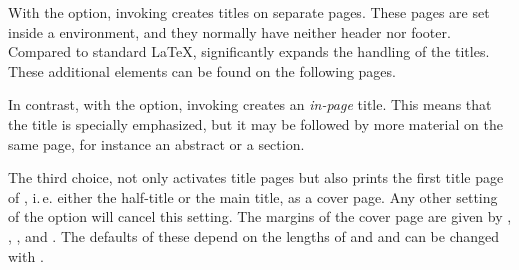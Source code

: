 With the %
 option,
invoking  creates titles on
separate pages. These pages are set inside a
 environment, and they
normally have neither header nor footer. Compared to standard {\LaTeX},
{\KOMAScript} significantly expands the handling of the titles. These
additional elements can be found on the following pages.

In contrast, with the
option, invoking  creates an
\emph{in-page} title. This means that the title is specially emphasized, but
it may be followed by more material on the same page, for instance an abstract
or a section.%

The third choice,%
 not only activates title
pages but also prints the first title page of
, i.\,e.
either the half-title or the main title, as a cover page. Any
other setting of the  option will cancel this setting. The
margins of the cover page are given
by , ,
, and . The defaults
of these depend on the lengths of 
and  and can be changed
with .

%
%
\EndIndexGroup


